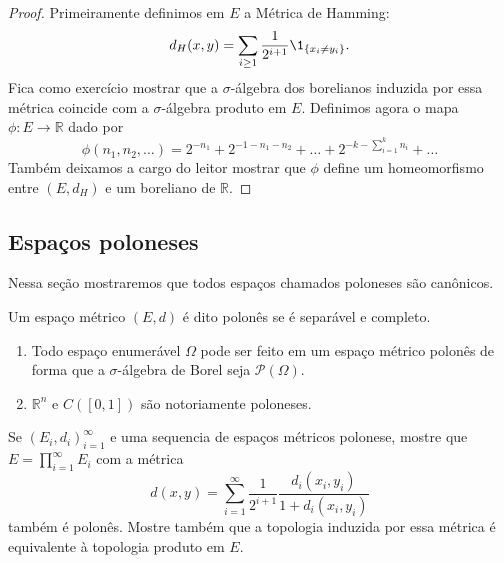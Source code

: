 \begin{proof}
  Primeiramente definimos em $E$ a Métrica de Hamming:
  \begin{equation}
    \label{e:hamming_distance}
    d_H(x,y) = \sum_{i \geq 1} \frac{1}{2^{i + 1}} \1_{\{x_i \neq y_i\}}.
  \end{equation}
  Fica como exercício mostrar que a $\sigma$-álgebra dos borelianos induzida por essa métrica coincide com a $\sigma$-álgebra produto em $E$.
  Definimos agora o mapa $\phi:E \to \mathbb{R}$ dado por
  \begin{equation}
    \phi(n_1, n_2, \dots) = 2^{-n_1} + 2^{-1 - n_1 - n_2} + \dots + 2^{-k - \sum_{i=1}^k n_i} + \dots
  \end{equation}
  Também deixamos a cargo do leitor mostrar que $\phi$ define um homeomorfismo entre $(E,d_H)$ e um boreliano de $\mathbb{R}$.
\end{proof}

\subsection{Espaços poloneses}

Nessa seção mostraremos que todos espaços chamados poloneses são canônicos.

\begin{definition}
  Um espaço métrico $(E,d)$ é dito polonês  se é separável e completo.
\end{definition}

\begin{example} \mbox{}
  \begin{enumerate}[\quad a)]
  \item Todo espaço enumerável $\Omega$ pode ser feito em um espaço métrico polonês de forma que a $\sigma$-álgebra de Borel seja $\mathcal{P}(\Omega)$.
  \item $\mathbb{R}^n$ e $C([0,1])$ são notoriamente poloneses.
  \end{enumerate}
\end{example}

\begin{exercise}
  Se $(E_i, d_i)_{i=1}^\infty$ e uma sequencia de espaços métricos polonese, mostre que $E = \prod_{i=1}^{\infty} E_i$ com a métrica
  \begin{equation}
    \label{e:metrica_produto}
    d(x,y) = \sum_{i=1}^{\infty} \frac{1}{2^{i+1}} \frac{d_i(x_i, y_i)}{1 + d_i(x_i, y_i)}
  \end{equation}
  também é polonês.
  Mostre também que a topologia induzida por essa métrica é equivalente à topologia produto em $E$.
\end{exercise}

